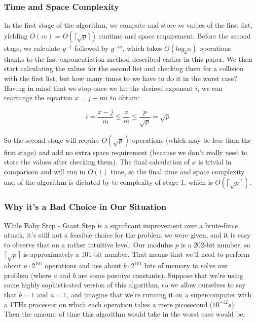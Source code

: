 \documentclass{article}
\begin{document}
      \subsubsection{Time and Space Complexity}

      In the first stage of the algorithm, we compute and store $m$ values of the first list, yielding $O(m) = O(\lceil{\sqrt{p}}\rceil)$ runtime and space requirement. Before the second stage, we calculate $g^{-1}$ followed by $g^{-m}$, which takes $O(log_2 n)$ operations thanks to the fast exponentiation method described earlier in this paper. We then start calculating the values for the second list and checking them for a collision with the first list, but how many times to we have to do it in the worst case? Having in mind that we stop once we hit the desired exponent $i$, we can rearrange the equation $x = j + mi$ to obtain:

      $$i = \frac{x-j}{m} \leq \frac{x}{m} \leq \frac{p}{\sqrt{p}} = \sqrt{p}$$

      So the second stage will require $O(\sqrt{p})$ operations (which may be less than the first stage) and add no extra space requirement (because we don't really need to store the values after checking them). The final calculation of $x$ is trivial in comparison and will run in $O(1)$ time, so the final time and space complexity and of the algorithm is dictated by te complexity of stage 1, which is $O(\lceil{\sqrt{p}}\rceil)$.

      \subsubsection{Why it's a Bad Choice in Our Situation}

      While Baby Step - Giant Step is a significant improvement over a brute-force attack, it's still not a feasible choice for the problem we were given, and it is easy to observe that on a rather intuitive level. Our modulus $p$ is a 202-bit number, so $\lceil{\sqrt{p}}\rceil$ is approximately a 101-bit number. That means that we'll need to perform about $a \cdot 2^{101}$ operations and use about $b \cdot 2^{101}$ bits of memory to solve our problem (where $a$ and $b$ are some positive constants). Suppose that we're using some highly sophisticated version of this algorithm, so we allow ourselves to say that $b = 1$ and $a = 1$, and imagine that we're running it on a supercomputer with a 1THz processor on which each operation takes a mere picosecond ($10^{-12}s$). Then the amount of time this algorithm would take in the worst case would be:
\end{document}
